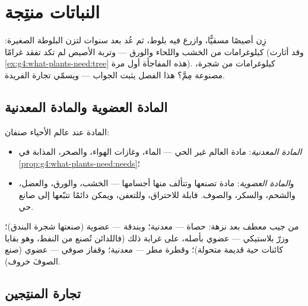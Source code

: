 \chapter{النباتات منتِجة}\label{ch:g6:plants-are-producers}

زِن أصيصًا مسقيًّا، وازرع فيه  بلوط، ثم عُد بعد سنوات لتزن
البلوطة الصغيرة: كيلوغرامات من الخشب واللحاء والورق  ---
وتربة الأصيص لم تكد تفقد غرامًا (وقد أثارت
\cref{ex:g4:what-plants-need:tree} هذه المفاجأة أول مرة).
كيلوغرامات من شجرة، مصنوعة مِمَّ؟ هذا الفصل يثبت الجواب --- ويسمّي
تجارة  الفريدة.

\section{المادة العضوية والمادة المعدنية}

\begin{definition}\label{def:g6:plants-are-producers:matter}
المادة عند عالم الأحياء صنفان:
\begin{itemize}
  \item \emph{المادة المعدنية}: مادة العالم
        غير الحي --- الماء، وغازات الهواء، والصخر،  المذابة في \cref{prop:g4:what-plants-need:needs}؛
  \item و\emph{المادة العضوية}: مادة تصنعها
         وتتألف منها أجسامها --- الخشب، والورق،
        والعضل، والشحم، والسكر، والصوف. قابلة للاحتراق، وللتعفن،
        ويمكن دائمًا تتبّعها إلى صانع حي.
\end{itemize}
\end{definition}

\begin{example}\label{ex:g6:plants-are-producers:sorting}
من جيب معطف بعد نزهة: حصاة --- معدنية؛ وبندقة --- عضوية (صنعتها
شجرة البندق)؛ وزرّ بلاستيكي --- عضوي بأصله، على غرابة ذلك
(فاللدائن تُصنع من النفط، وهو بقايا كائنات حية قديمة متحولة)؛
وقطرة مطر --- معدنية؛ وقفاز صوفي --- عضوي (صنع الصوفَ خروف).
\end{example}

\section{تجارة المنتِجين}

